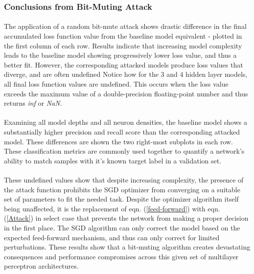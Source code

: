 \documentclass[12pt,letterpaper]{article}
\begin{document}
\subsubsection{Conclusions from Bit-Muting Attack}

\paragraph*{}The application of a random bit-mute attack shows drastic difference in the final accumulated loss function value from the baseline model equivalent - plotted in the first column of each row. Results indicate that increasing model complexity leads to the baseline model showing progressively lower loss value, and thus a better fit. However, the corresponding attacked models produce loss values that diverge, and are often undefined Notice how for the 3 and 4 hidden layer models, all final loss function values are undefined. This occurs when the loss value exceeds the maximum value of a double-precision floating-point number and thus returns \textit{inf} or \textit{NaN}. 

\paragraph*{}Examining all model depths and all neuron densities, the baseline model shows a substantially higher precision and recall score than the corresponding attacked model. These differences are shown the two right-most subplots in each row. These classification metrics are commonly used together to quantify a network's ability to match samples with it's known target label in a validation set. 

\paragraph*{}These undefined values show that despite increasing complexity, the presence of the attack function prohibits the SGD optimizer from converging on a suitable set of parameters to fit the needed task. Despite the optimizer algorithm itself being unaffected, it is the replacement of eqn. (\ref{feed-forward}) with eqn. (\ref{Attack}) in select case that prevents the network from making a proper decision in the first place. The SGD algorithm can only correct the model based on the expected feed-forward mechanism, and thus can only correct for limited perturbations. These results show that a bit-muting algorithm creates devastating consequences and performance compromises across this given set of multilayer perceptron architectures. 
\end{document}
